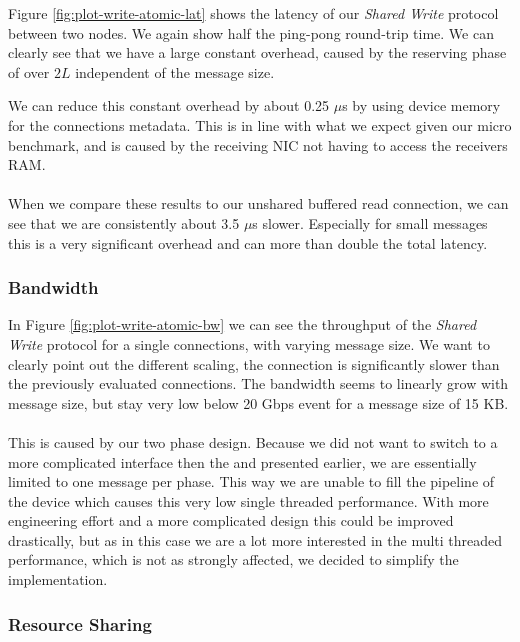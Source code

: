 Figure \ref{fig:plot-write-atomic-lat} shows the latency of our \emph{Shared Write} protocol between two nodes. 
We again show half the ping-pong round-trip time. We can clearly see that we have a large constant overhead, caused
by the reserving phase of over $2L$ independent of the message size.

We can reduce this constant overhead by about 0.25 $\mu$s by using device memory for the connections metadata. This is 
in line with what we expect given our micro benchmark, and is caused by the receiving NIC not having to access the 
receivers RAM.

\paragraph{} When we compare these results to our unshared buffered read connection, we can see that we are consistently
about 3.5 $\mu$s slower. Especially for small messages this is a very significant overhead and can more than double the 
total latency.


\subsubsection{Bandwidth}

In Figure \ref{fig:plot-write-atomic-bw} we can see the throughput of the \emph{Shared Write} protocol for a single 
connections, with varying message size.  We want to clearly point out the different scaling, the connection is 
significantly slower than the previously evaluated connections. The bandwidth seems to linearly grow with message
size, but stay very low below 20 Gbps event for a message size of 15 KB.

\paragraph{} This is caused by our two phase design. Because we did not want to switch to a more complicated interface 
then the  and  presented earlier, we are essentially limited to one message per phase.
This way we are unable to fill the pipeline of the device which causes this very low single threaded performance. With 
more engineering effort and a more complicated design this could be improved drastically, but as in this case we are 
a lot more interested in the multi threaded performance, which is not as strongly affected, we decided to simplify the
implementation.


\subsubsection{Resource Sharing}

